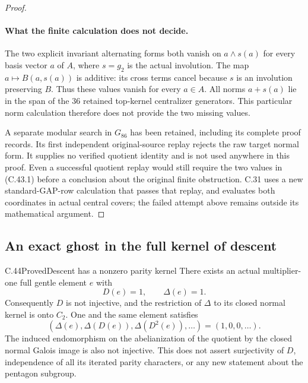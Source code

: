 \begin{proof}
\paragraph{What the finite calculation does not decide.}
The two explicit invariant alternating forms both vanish on
$a\wedge s(a)$ for every basis vector $a$ of $A$, where
$s=g_2$ is the actual involution.  The map
$a\mapsto B(a,s(a))$ is additive: its cross terms cancel because
$s$ is an involution preserving $B$.  Thus these values vanish for
every $a\in A$.  All norms $a+s(a)$ lie in the span of the $36$
retained top-kernel centralizer generators.  This particular norm
calculation therefore does not provide the two missing values.

A separate modular search in $G_{86}$ has been retained, including
its complete proof records.  Its first independent original-source
replay rejects the raw target normal form.  It supplies no verified
quotient identity and is not used anywhere in this proof.  Even a
successful quotient replay would still require the two values in
(C.43.1) before a conclusion about the original finite obstruction.
C.31 uses a new standard-GAP-row calculation that passes that replay,
and evaluates both coordinates in actual central covers; the failed
attempt above remains outside its mathematical argument.
\end{proof}


\subsection{An exact ghost in the full kernel of descent}

\begin{statement}{C.44}{Proved}{Descent has a nonzero parity kernel}
There exists an actual multiplier-one full gentle element $e$ with
\[
             D(e)=1,\qquad \Delta(e)=1.                 \tag{C.44.1}
\]
Consequently $D$ is not injective, and the restriction of $\Delta$
to its closed normal kernel is onto $C_2$. One and the same element
satisfies
\[
       (\Delta(e),\Delta(D(e)),\Delta(D^2(e)),\ldots)
                         =(1,0,0,\ldots).              \tag{C.44.2}
\]
The induced endomorphism on the abelianization of the quotient by
the closed normal Galois image is also not injective. This does not
assert surjectivity of $D$, independence of all its iterated parity
characters, or any new statement about the pentagon subgroup.
\end{statement}

